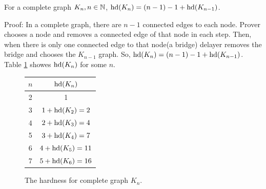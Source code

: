 \documentclass[12pt]{book}
\begin{document}
\begin{conj}\label{con:hd_game1}
      For a complete graph $K_n, n \in \mathbb{N}$, $\operatorname{hd}(K_n)= (n-1)-1+\operatorname{hd}(K_{n-1}) $. 
	  
	  Proof: In a complete graph, there are $n-1$ connected edges to each node. 	  Prover chooses a node and removes a connected edge of 
	  that node in each step. Then, when there is only one connected edge to that node(a bridge) delayer removes the bridge and chooses the 
	  $K_{n-1}$ graph. So, $\operatorname{hd}(K_n)= (n-1)-1+\operatorname{hd}(K_{n-1}) $.
	  Table \ref{fig:table1} showes $\operatorname{hd}(K_n)$ for some $n$.
	  \begin{figure}[h]
       \centering
       \begin{tabular}{|c|c|} 
                  \hline
                  $n$ & $\operatorname{hd}(K_n)$ \\ \hline
				  2 & 1  \\ \hline
				  3 & $1+ \operatorname{hd}(K_2)=2$ \\ \hline
			      4 & $2+ \operatorname{hd}(K_3)=4$  \\ \hline
				  5 & $3+ \operatorname{hd}(K_4)=7$  \\ \hline
				  6 & $4+ \operatorname{hd}(K_5)=11$  \\ \hline
				  7 & $5+ \operatorname{hd}(K_6)=16$  \\ \hline
       \end{tabular}
       \caption{The hardness for complete graph $K_n$.}
       \label{fig:table1}
      \end{figure}
\end{conj}
\end{document}
